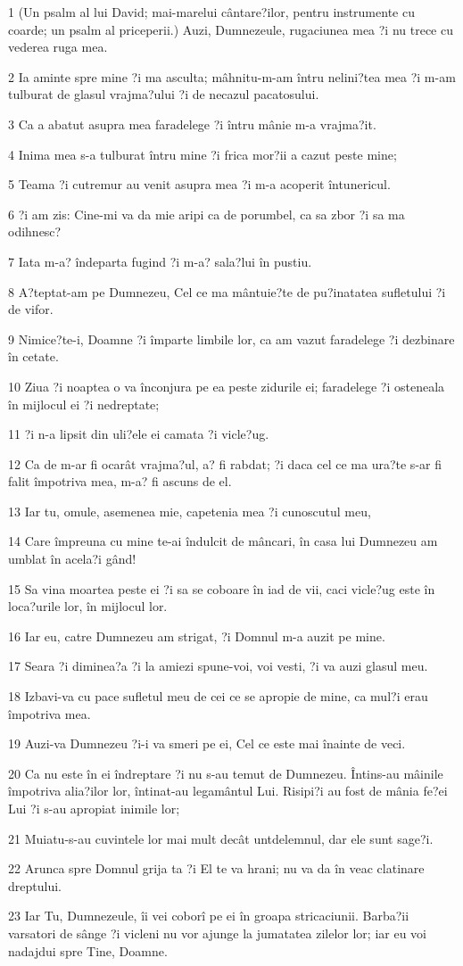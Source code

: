 \par 1 (Un psalm al lui David; mai-marelui cântare?ilor, pentru instrumente cu coarde; un psalm al priceperii.) Auzi, Dumnezeule, rugaciunea mea ?i nu trece cu vederea ruga mea.
\par 2 Ia aminte spre mine ?i ma asculta; mâhnitu-m-am întru nelini?tea mea ?i m-am tulburat de glasul vrajma?ului ?i de necazul pacatosului.
\par 3 Ca a abatut asupra mea faradelege ?i întru mânie m-a vrajma?it.
\par 4 Inima mea s-a tulburat întru mine ?i frica mor?ii a cazut peste mine;
\par 5 Teama ?i cutremur au venit asupra mea ?i m-a acoperit întunericul.
\par 6 ?i am zis: Cine-mi va da mie aripi ca de porumbel, ca sa zbor ?i sa ma odihnesc?
\par 7 Iata m-a? îndeparta fugind ?i m-a? sala?lui în pustiu.
\par 8 A?teptat-am pe Dumnezeu, Cel ce ma mântuie?te de pu?inatatea sufletului ?i de vifor.
\par 9 Nimice?te-i, Doamne ?i împarte limbile lor, ca am vazut faradelege ?i dezbinare în cetate.
\par 10 Ziua ?i noaptea o va înconjura pe ea peste zidurile ei; faradelege ?i osteneala în mijlocul ei ?i nedreptate;
\par 11 ?i n-a lipsit din uli?ele ei camata ?i vicle?ug.
\par 12 Ca de m-ar fi ocarât vrajma?ul, a? fi rabdat; ?i daca cel ce ma ura?te s-ar fi falit împotriva mea, m-a? fi ascuns de el.
\par 13 Iar tu, omule, asemenea mie, capetenia mea ?i cunoscutul meu,
\par 14 Care împreuna cu mine te-ai îndulcit de mâncari, în casa lui Dumnezeu am umblat în acela?i gând!
\par 15 Sa vina moartea peste ei ?i sa se coboare în iad de vii, caci vicle?ug este în loca?urile lor, în mijlocul lor.
\par 16 Iar eu, catre Dumnezeu am strigat, ?i Domnul m-a auzit pe mine.
\par 17 Seara ?i diminea?a ?i la amiezi spune-voi, voi vesti, ?i va auzi glasul meu.
\par 18 Izbavi-va cu pace sufletul meu de cei ce se apropie de mine, ca mul?i erau împotriva mea.
\par 19 Auzi-va Dumnezeu ?i-i va smeri pe ei, Cel ce este mai înainte de veci.
\par 20 Ca nu este în ei îndreptare ?i nu s-au temut de Dumnezeu. Întins-au mâinile împotriva alia?ilor lor, întinat-au legamântul Lui. Risipi?i au fost de mânia fe?ei Lui ?i s-au apropiat inimile lor;
\par 21 Muiatu-s-au cuvintele lor mai mult decât untdelemnul, dar ele sunt sage?i.
\par 22 Arunca spre Domnul grija ta ?i El te va hrani; nu va da în veac clatinare dreptului.
\par 23 Iar Tu, Dumnezeule, îi vei coborî pe ei în groapa stricaciunii. Barba?ii varsatori de sânge ?i vicleni nu vor ajunge la jumatatea zilelor lor; iar eu voi nadajdui spre Tine, Doamne.

